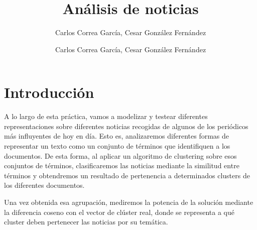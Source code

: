 \documentclass[11pt]{article}
\author{Carlos Correa García, Cesar González Fernández}
\begin{document}
\topmargin=-0.45in
\evensidemargin=0in
\oddsidemargin=0in
\textwidth=6.5in
\textheight=9.0in
\headsep=0.25in

\linespread{1.1}
 \pagestyle{fancy}
 \cfoot{}

\renewcommand\headrulewidth{0.4pt}
\renewcommand\footrulewidth{0.4pt}

\posttitle{\end{center}}

\title{Análisis de noticias}

\author{Carlos Correa García, Cesar González Fernández}
\maketitle

\newpage

\renewcommand{\contentsname}{Índice}
\tableofcontents

\newpage

\section{Introducción}

A lo largo de esta práctica, vamos a modelizar y testear diferentes
representaciones sobre diferentes noticias recogidas de algunos de los
periódicos más influyentes de hoy en día. Esto es, analizaremos
diferentes formas de representar un texto como un conjunto de términos
que identifiquen a los documentos. De esta forma, al aplicar un
algoritmo de clustering sobre esos conjuntos de términos, clasificaremos
las noticias mediante la similitud entre términos y obtendremos un
resultado de pertenencia a determinados clusters de los diferentes
documentos.

Una vez obtenida esa agrupación, mediremos la potencia de la solución
mediante la diferencia coseno con el vector de clúster real, donde se
representa a qué cluster deben pertenecer las noticias por su temática.
\end{document}
